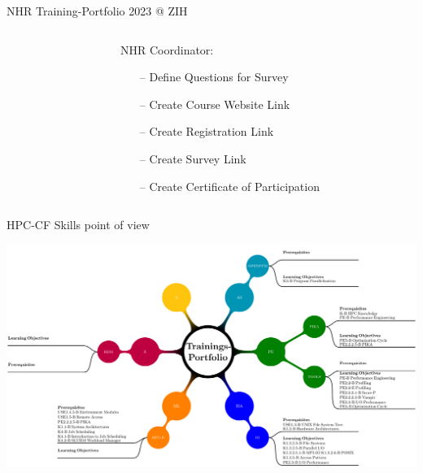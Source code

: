 \documentclass[compress,aspectratio=169]{beamer}
\begin{document}
\begin{frame}{NHR Training-Portfolio 2023 @ ZIH}
{\begin{columns}[T]
\begin{column}{0.55\textwidth}
\begin{itemize}
\end{itemize}
\end{column}
\begin{column}{0.55\textwidth}
NHR Coordinator:
\begin{itemize}[itemsep=0pt]
 \item[--] Define Questions for Survey 
 \item[--] Create Course Website Link
 \item[--] Create Registration Link
 \item[--] Create Survey Link
 \item[--] Create Certificate of Participation
\end{itemize}
\end{column}

\end{columns}
}
\end{frame}


\begin{frame}{HPC-CF Skills point of view}
\vspace*{-0.9cm}
 
 \includegraphics[width=1.05\textwidth]{zih_automate_14122021.pdf} 

\end{frame}
\end{document}
